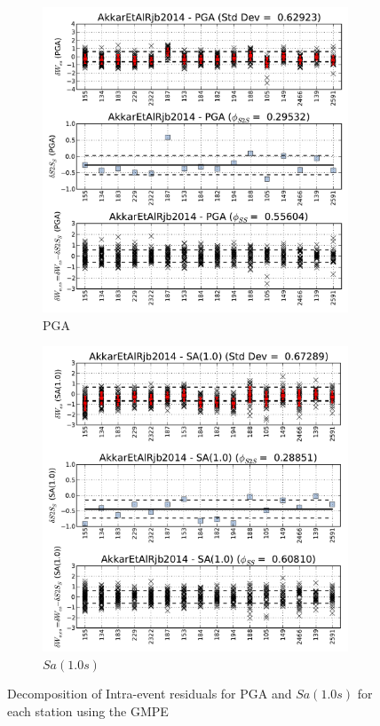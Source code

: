 \begin{figure}[htb]
  \centering
  \begin{subfigure}[b]{0.49\textwidth}
      \includegraphics[width=\textwidth]{./figures/residuals/Single_Station_IntraEvent_PGA.pdf}
      \caption{PGA}
      \label{fig:ssa_intra_pga}
  \end{subfigure}
    \begin{subfigure}[b]{0.49\textwidth}
      \includegraphics[width=\textwidth]{./figures/residuals/Single_Station_IntraEvent_Sa1.pdf}
      \caption{$Sa \left( {1.0s} \right)$}
      \label{fig:ssa_intra_sa1}
  \end{subfigure}
  \caption{Decomposition of Intra-event residuals for PGA and $Sa \left( {1.0 s} \right)$ for each station using the \cite{Akkar_etal2014} GMPE}
  \label{fig:ssa_intra_decom}
\end{figure}

